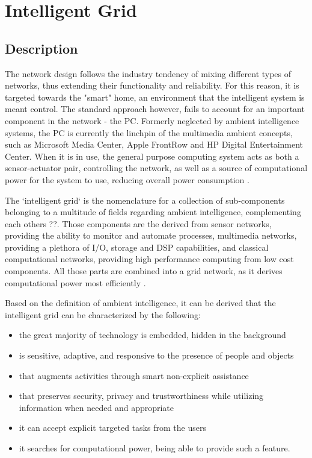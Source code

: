 \documentclass[12pt, english, a4paper]{report}
\begin{document}
\chapter{Intelligent Grid}

\section {Description}

The network design follows the industry tendency of mixing different types of networks, thus extending their functionality and reliability.
For this reason, it is targeted towards the "smart" home, an environment that the intelligent system is meant control. The standard
approach however, fails to account for an important component in the network - the PC. Formerly neglected by ambient intelligence systems,
the PC is currently the linchpin of the multimedia ambient concepts, such as Microsoft Media Center, Apple FrontRow and HP Digital 
Entertainment Center. When it is in use, the general purpose computing system acts as both a sensor-actuator pair, controlling the network,
as well as a source of computational power for the system to use, reducing overall power consumption \cite{95}.

The `intelligent grid` is the nomenclature for a collection of sub-components belonging to a multitude of fields regarding ambient intelligence,
complementing each others ??. Those components are the derived from sensor networks, providing the ability to monitor and automate processes,
multimedia networks, providing a plethora of I/O, storage and DSP capabilities, and classical computational networks, providing high performance
computing from low cost components. All those parts are combined into a grid network, as it derives computational power most efficiently
\cite{3, 8, 9, 19, 30, 32, 33, 38}.

Based on the definition of ambient intelligence, it can be derived that the intelligent grid can be characterized by the following:
\begin{itemize}
    \item the great majority of technology is embedded, hidden in the background 
    \item is sensitive, adaptive, and responsive to the presence of people and objects 
    \item that augments activities through smart non-explicit assistance 
    \item that preserves security, privacy and trustworthiness while utilizing information when needed and appropriate 
    \item it can accept explicit targeted tasks from the users 
    \item it searches for computational power, being able to provide such a feature. 
\end{itemize}
\end{document}
